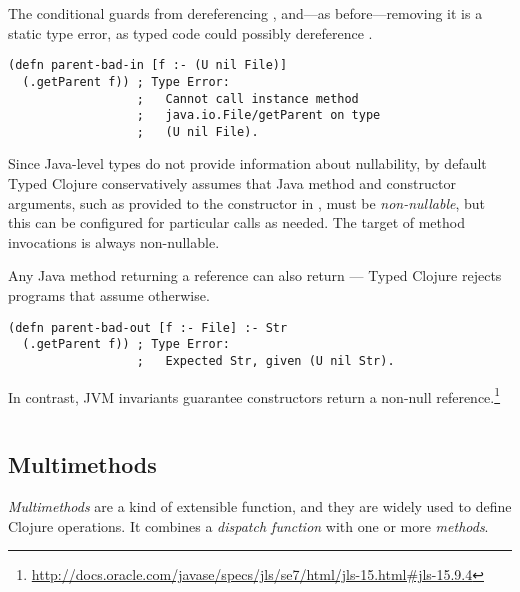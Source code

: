 The conditional guards from dereferencing , and---as before---removing 
it is a static type error, as typed code could possibly dereference .
\begin{verbatim}
(defn parent-bad-in [f :- (U nil File)]
  (.getParent f)) ; Type Error:
                  ;   Cannot call instance method 
                  ;   java.io.File/getParent on type 
                  ;   (U nil File).
\end{verbatim}
Since Java-level types do not provide information about nullability,
by default Typed Clojure conservatively assumes that Java method and
constructor arguments, such as  provided to the  constructor in
,
 must be \emph{non-nullable}, but this can be
configured for  particular calls as needed.
The target of method invocations is always non-nullable.

Any Java method returning a reference can also return  ---
Typed Clojure rejects programs that assume otherwise.
%
\begin{verbatim}
(defn parent-bad-out [f :- File] :- Str
  (.getParent f)) ; Type Error:
                  ;   Expected Str, given (U nil Str).
\end{verbatim}

%

In contrast, JVM invariants guarantee constructors return a non-null reference.\footnote{\url{http://docs.oracle.com/javase/specs/jls/se7/html/jls-15.html#jls-15.9.4}}
%
\begin{exmp}
\inputminted[firstline=15,lastline=16]{clojure}{code/demo/src/demo/parent3.clj}
\end{exmp}


\subsection{Multimethods}

\label{sec:multioverview}

\emph{Multimethods} are a kind of extensible function, and they are
widely used to define Clojure operations.  It combines a
\emph{dispatch function} with one or more \emph{methods}.

